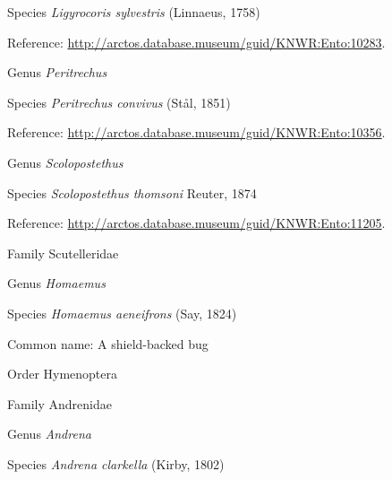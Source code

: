 \documentclass[9pt, article]{memoir}
\begin{document}
\begin{multicols}{2}
\vspace{6pt}\noindent\hspace{36pt}Species \textit{Ligyrocoris sylvestris} (Linnaeus, 1758)


Reference: 
\url{http://arctos.database.museum/guid/KNWR:Ento:10283}.

\vspace{6pt}\noindent\hspace{30pt}Genus \textit{Peritrechus}


\vspace{6pt}\noindent\hspace{36pt}Species \textit{Peritrechus convivus} (Stål, 1851)


Reference: 
\url{http://arctos.database.museum/guid/KNWR:Ento:10356}.

\vspace{6pt}\noindent\hspace{30pt}Genus \textit{Scolopostethus}


\vspace{6pt}\noindent\hspace{36pt}Species \textit{Scolopostethus thomsoni} Reuter, 1874


Reference: 
\url{http://arctos.database.museum/guid/KNWR:Ento:11205}.

\vspace{6pt}\noindent\hspace{24pt}Family Scutelleridae


\vspace{6pt}\noindent\hspace{30pt}Genus \textit{Homaemus}


\vspace{6pt}\noindent\hspace{36pt}Species \textit{Homaemus aeneifrons} (Say, 1824)


Common name: A shield-backed bug

\vspace{6pt}\noindent\hspace{18pt}Order Hymenoptera


\vspace{6pt}\noindent\hspace{24pt}Family Andrenidae


\vspace{6pt}\noindent\hspace{30pt}Genus \textit{Andrena}


\vspace{6pt}\noindent\hspace{36pt}Species \textit{Andrena clarkella} (Kirby, 1802)



\end{multicols}
\end{document}
